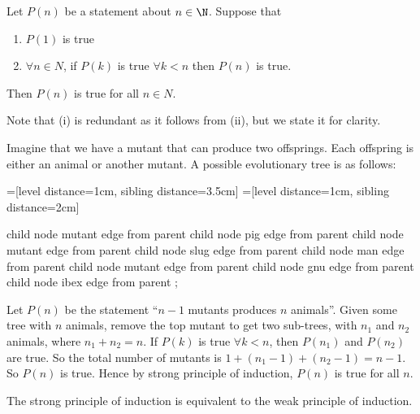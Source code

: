 \documentclass[a4paper]{article}
\begin{document}
\begin{thm}
  Let $P(n)$ be a statement about $n\in \N$. Suppose that
  \begin{enumerate}
    \item $P(1)$ is true
    \item $\forall n\in N$, if $P(k)$ is true $\forall k < n$ then $P(n)$ is true.
  \end{enumerate}
  Then $P(n)$ is true for all $n\in N$.
\end{thm}
Note that (i) is redundant as it follows from (ii), but we state it for clarity.

\begin{eg} 
Imagine that we have a mutant that can produce two offsprings. Each offspring is either an animal or another mutant. A possible evolutionary tree is as follows:

  =[level distance=1cm, sibling distance=3.5cm]
  =[level distance=1cm, sibling distance=2cm]
  \begin{center}
    \begin{tikz}
      child {
        node {mutant} edge from parent
        child {
          node {pig} edge from parent
        }
        child {
          node {mutant} edge from parent
          child {
            node {slug} edge from parent
          }
          child {
            node {man} edge from parent
          }
        }
      }
      child {
        node {mutant} edge from parent
        child {
          node {gnu} edge from parent
        }
        child {
          node {ibex} edge from parent
        }
      };
    \end{tikz}
  \end{center}
  Let $P(n)$ be the statement ``$n - 1$ mutants produces $n$ animals''. Given some tree with $n$ animals, remove the top mutant to get two sub-trees, with $n_1$ and $n_2$ animals, where $n_1 + n_2 = n$. If $P(k)$ is true $\forall k < n$, then $P(n_1)$ and $P(n_2)$ are true. So the total number of mutants is $1 + (n_1 - 1) + (n_2 - 1) = n - 1$. So $P(n)$ is true. Hence by strong principle of induction, $P(n)$ is true for all $n$.
\end{eg}

\begin{thm}
  The strong principle of induction is equivalent to the weak principle of induction.
\end{thm}
\end{document}
